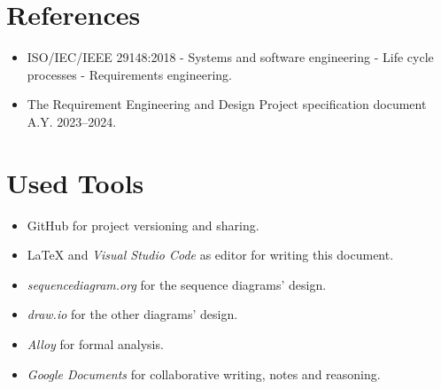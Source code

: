 \section{References}
\label{sec:references}%

\begin{itemize}
    \item ISO/IEC/IEEE 29148:2018 - Systems and software engineering - Life cycle processes - Requirements engineering.
    \item The Requirement Engineering and Design Project specification document A.Y. 2023–2024. 
\end{itemize}

\section{Used Tools}
\label{sec:used_tools}%
\begin{itemize}
    \item GitHub for project versioning and sharing.
    \item \LaTeX{} and \textit{Visual Studio Code} as editor for writing this document.
    \item \textit{sequencediagram.org} for the sequence diagrams' design.
    \item \textit{draw.io} for the other diagrams' design.
    \item \textit{Alloy} for formal analysis.
    \item \textit{Google Documents} for collaborative writing, notes and reasoning.
\end{itemize}
